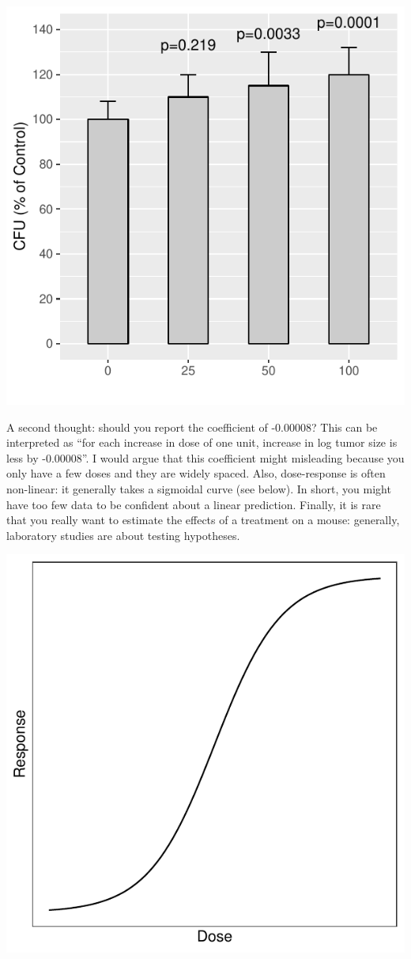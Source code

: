 \documentclass[]{book}
\begin{document}
\includegraphics{09-answers_files/figure-latex/week5u-1.pdf}

A second thought: should you report the coefficient of -0.00008? This
can be interpreted as ``for each increase in dose of one unit, increase
in log tumor size is less by -0.00008''. I would argue that this
coefficient might misleading because you only have a few doses and they
are widely spaced. Also, dose-response is often non-linear: it generally
takes a sigmoidal curve (see below). In short, you might have too few
data to be confident about a linear prediction. Finally, it is rare that
you really want to estimate the effects of a treatment on a mouse:
generally, laboratory studies are about testing hypotheses.

\includegraphics{09-answers_files/figure-latex/week5v-1.pdf}
\end{document}
